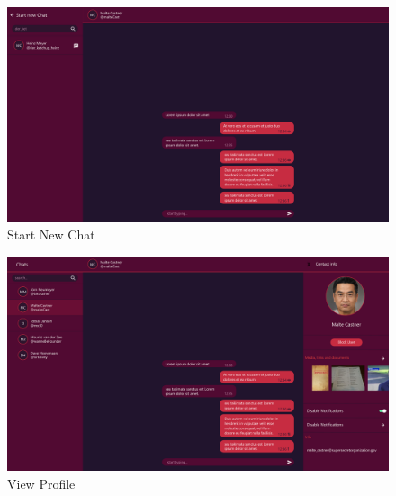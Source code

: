 \begin{figure}[h]
    \centering
    \includegraphics[width=1.0\textwidth]{./graphics/wireframes/StartNewChat}
    \caption{Start New Chat}
    \label{fig:figure29}
\end{figure}

\begin{figure}[h]
    \centering
    \includegraphics[width=1.0\textwidth]{./graphics/wireframes/ViewProfile}
    \caption{View Profile}
    \label{fig:figure30}
\end{figure}
